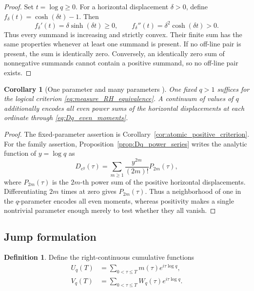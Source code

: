 \documentclass[11pt]{amsart}
\numberwithin{equation}{section}
\theoremstyle{plain}
\newtheorem{corollary}[theorem]{Corollary}
\theoremstyle{definition}
\newtheorem{definition}[theorem]{Definition}
\theoremstyle{remark}
\newcommand{\1}{\mathbf{1}}
\begin{document}
\begin{proof}
Set \(t=\log q\geq0\).  For a horizontal displacement \(\delta>0\),
define \(f_\delta(t)=\cosh(\delta t)-1\).  Then
\begin{equation}
f_\delta'(t)=\delta\sinh(\delta t)\geq0,
\qquad
f_\delta''(t)=\delta^2\cosh(\delta t)>0.
\label{eq:Dq_monotonicity_derivatives_detailed}
\end{equation}
Thus every summand is increasing and strictly convex.  Their finite sum has
the same properties whenever at least one summand is present.  If no
off-line pair is present, the sum is identically zero.  Conversely, an
identically zero sum of nonnegative summands cannot contain a positive
summand, so no off-line pair exists.
\end{proof}


\begin{corollary}[One parameter and many parameters {}]
\label{cor:one_many_q}
One fixed $q>1$ suffices for the logical criterion
\eqref{eq:measure_RH_equivalence}.  A continuum of values of $q$ additionally
encodes all even power sums of the horizontal displacements at each
ordinate through \eqref{eq:Dq_even_moments}.
\end{corollary}

\begin{proof}
The fixed-parameter assertion is Corollary~\ref{cor:atomic_positive_criterion}.
For the family assertion, Proposition~\ref{prop:Dq_power_series} writes the
analytic function of \(y=\log q\) as
\begin{equation}
D_{e^y}(\tau)
=
\sum_{m\geq1}\frac{y^{2m}}{(2m)!}P_{2m}(\tau),
\label{eq:one_many_q_generating_function}
\end{equation}
where \(P_{2m}(\tau)\) is the \(2m\)-th power sum of the positive
horizontal displacements.  Differentiating \(2m\) times at zero gives
\(P_{2m}(\tau)\).  Thus a neighborhood of one in the \(q\)-parameter
encodes all even moments, whereas positivity makes a single nontrivial
parameter enough merely to test whether they all vanish.
\end{proof}

\subsection{Jump formulation}
\label{subsec:jump_formulation}

\begin{definition}
\label{def:cumulative_complete_walks}
Define the right-continuous cumulative functions
\begin{align}
U_q(T)
&=
\sum_{0<\tau\leq T}m(\tau)e^{i\tau\log q},
\label{eq:Uq_cumulative}
\\
V_q(T)
&=
\sum_{0<\tau\leq T}W_q(\tau)e^{i\tau\log q}.
\label{eq:Vq_cumulative}
\end{align}
\end{definition}
\end{document}
